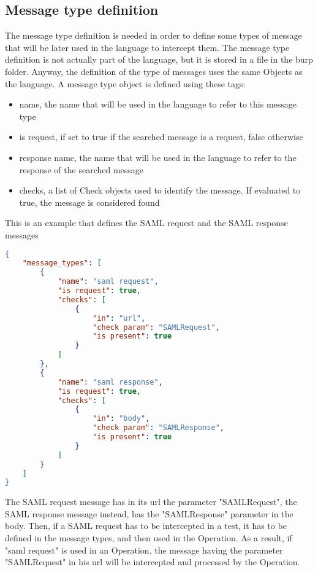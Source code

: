 \subsection{Message type definition}
The message type definition is needed in order to define some types of message that will be later used in the language to intercept them.
The message type definition is not actually part of the language, but it is stored in a file in the \Gls{burp} folder. Anyway, the definition of the type of messages uses the same Objects as the language.
A message type object is defined using these tags:
\begin{itemize}
    \item name, the name that will be used in the language to refer to this message type
    \item is request, if set to true if the searched message is a request, false otherwise
    \item response name, the name that will be used in the language to refer to the response of the searched message
    \item checks, a list of Check objects used to identify the message. If evaluated to true, the message is considered found
\end{itemize}

This is an example that defines the \Gls{SAML} request and the \Gls{SAML} response messages
\begin{lstlisting}[language=json]
{
    "message_types": [
        {
            "name": "saml request",
            "is request": true,
            "checks": [
                {
                    "in": "url",
                    "check param": "SAMLRequest",
                    "is present": true
                }
            ]
        },
        {
            "name": "saml response",
            "is request": true,
            "checks": [
                {
                    "in": "body",
                    "check param": "SAMLResponse",
                    "is present": true
                }
            ]
        }
    ]
}
\end{lstlisting}
The \Gls{SAML} request message has in its url the parameter "SAMLRequest", the \Gls{SAML} response message instead, has the "SAMLResponse" parameter in the body. Then, if a \Gls{SAML} request has to be intercepted in a test, it has to be defined in the message types, and then used in the Operation.
As a result, if "saml request" is used in an Operation, the message having the parameter "SAMLRequest" in his url will be intercepted and processed by the Operation.


